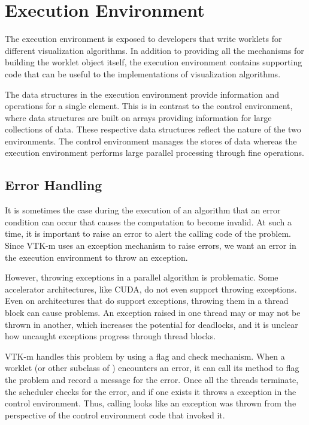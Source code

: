 
\chapter{Execution Environment}
\label{chap:ExecutionEnvironment}


The execution environment is exposed to developers that write worklets for
different visualization algorithms. In addition to providing all the
mechanisms for building the worklet object itself, the execution
environment contains supporting code that can be useful to the
implementations of visualization algorithms.

The data structures in the execution environment provide information and
operations for a single element. This is in contrast to the control
environment, where data structures are built on arrays providing
information for large collections of data. These respective data structures
reflect the nature of the two environments. The control environment manages
the stores of data whereas the execution environment performs large
parallel processing through fine operations.


\section{Error Handling}
\label{sec:ExecutionEnvironment:ErrorHandling}

It is sometimes the case during the execution of an algorithm that an error
condition can occur that causes the computation to become invalid. At such
a time, it is important to raise an error to alert the calling code of the
problem. Since VTK-m uses an exception mechanism to raise errors, we want
an error in the execution environment to throw an exception.

However, throwing exceptions in a parallel algorithm is problematic. Some
accelerator architectures, like CUDA, do not even support throwing
exceptions. Even on architectures that do support exceptions, throwing them
in a thread block can cause problems. An exception raised in one thread may
or may not be thrown in another, which increases the potential for
deadlocks, and it is unclear how uncaught exceptions progress through
thread blocks.

VTK-m handles this problem by using a flag and check mechanism. When a
worklet (or other subclass of ) encounters an error,
it can call its  method to flag the problem and record
a message for the error. Once all the threads terminate, the scheduler
checks for the error, and if one exists it throws a
 exception in the control environment. Thus,
calling  looks like an exception was thrown from the
perspective of the control environment code that invoked it.

